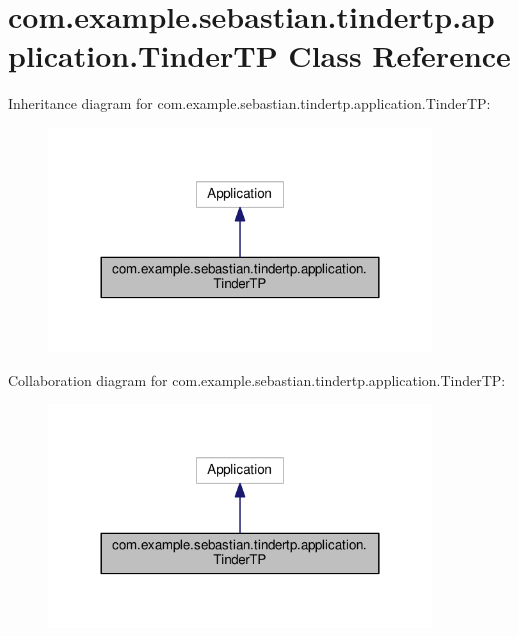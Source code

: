 \hypertarget{classcom_1_1example_1_1sebastian_1_1tindertp_1_1application_1_1TinderTP}{}\section{com.\+example.\+sebastian.\+tindertp.\+application.\+Tinder\+TP Class Reference}
\label{classcom_1_1example_1_1sebastian_1_1tindertp_1_1application_1_1TinderTP}


Inheritance diagram for com.\+example.\+sebastian.\+tindertp.\+application.\+Tinder\+TP\+:
\nopagebreak
\begin{figure}[H]
\begin{center}
\leavevmode
\includegraphics[width=288pt]{classcom_1_1example_1_1sebastian_1_1tindertp_1_1application_1_1TinderTP__inherit__graph}
\end{center}
\end{figure}


Collaboration diagram for com.\+example.\+sebastian.\+tindertp.\+application.\+Tinder\+TP\+:
\nopagebreak
\begin{figure}[H]
\begin{center}
\leavevmode
\includegraphics[width=288pt]{classcom_1_1example_1_1sebastian_1_1tindertp_1_1application_1_1TinderTP__coll__graph}
\end{center}
\end{figure}

